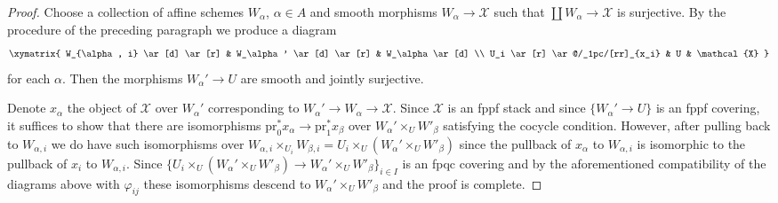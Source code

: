 \begin{proof}
\medskip\noindent
Choose a collection of affine schemes $W_\alpha$, $\alpha \in A$
and smooth morphisms $W_\alpha \to \mathcal{X}$ such that
$\coprod W_\alpha \to \mathcal{X}$ is surjective.
By the procedure of the preceding paragraph we produce
a diagram
$$
\xymatrix{
W_{\alpha, i} \ar[d] \ar[r] &
W_\alpha' \ar[d] \ar[r] &
W_\alpha \ar[d] \\
U_i \ar[r] \ar@/_1pc/[rr]_{x_i} &
U &
\mathcal{X}
}
$$
for each $\alpha$. Then the morphisms $W_\alpha' \to U$ are
smooth and jointly surjective.

\medskip\noindent
Denote $x_\alpha$ the object of $\mathcal{X}$ over $W_\alpha'$
corresponding to $W_\alpha' \to W_\alpha \to \mathcal{X}$.
Since $\mathcal{X}$ is an fppf stack and since
$\{W_\alpha' \to U\}$ is an fppf covering, it suffices
to show that there are isomorphisms
$\text{pr}_0^*x_\alpha \to \text{pr}_1^*x_\beta$
over $W_\alpha' \times_U W'_\beta$ satisfying the
cocycle condition. However, after pulling back to
$W_{\alpha, i}$ we do have such isomorphisms over
$W_{\alpha, i} \times_{U_i} W_{\beta, i} =
U_i \times_U (W_\alpha' \times_U W'_\beta)$
since the pullback of $x_\alpha$ to $W_{\alpha, i}$
is isomorphic to the pullback of $x_i$ to $W_{\alpha, i}$.
Since $\{U_i \times_U (W_\alpha' \times_U W'_\beta) \to
W_\alpha' \times_U W'_\beta\}_{i \in I}$
is an fpqc covering and by the aforementioned compatibility
of the diagrams above with $\varphi_{ij}$ these
isomorphisms descend to $W_\alpha' \times_U W'_\beta$
and the proof is complete.
\end{proof}
